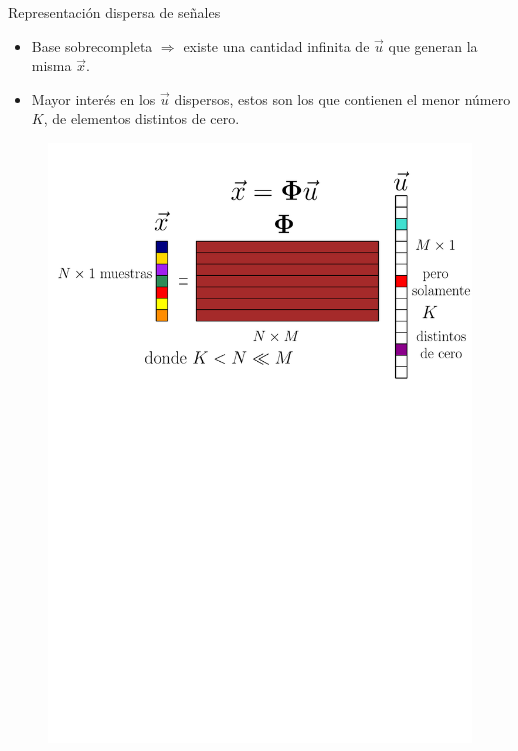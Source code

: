 \documentclass[xcolor=table]{beamer}
\begin{document}
\begin{frame}{Representaci\'on dispersa de se\~nales}
	\begin{itemize}
		\item<2-> Base sobrecompleta $\Rightarrow$ existe una cantidad infinita de $\vec{u}$ que generan la misma $\vec{x}$.
		\item<3-> Mayor inter\'es en los $\vec{u}$ dispersos, estos son los que contienen el menor n\'umero $K$, de elementos 					  distintos de cero.
		\end{itemize}\pause
    \begin{figure}[h!]
    \centering
      \includegraphics[scale=0.45]{sparse_diagram.pdf}
    \end{figure}
\end{frame}
\end{document}
